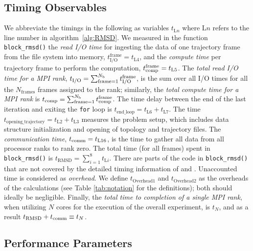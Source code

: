 \subsection{Timing Observables}

We abbreviate the timings in the following as variables $t_{\text{L$n$}}$ where $\text{L$n$}$ refers to the line number in algorithm~\ref{alg:RMSD}.
We measured in the function \texttt{block\_rmsd()} the \emph{read I/O time} for ingesting the data of one trajectory frame from the file system into memory, $t_{\text{I/O}}^{\text{frame}} = t_{\text{L4}}$, and the \emph{compute time} per trajectory frame to perform the computation, ${t}_{\text{comp}}^{\text{frame}} = t_{\text{L5}}$.
The \emph{total read I/O time for a MPI rank},  ${t}_{\text{I/O}} = \sum_{\text{frame}=1}^{N_{\text{b}}} {t}_{\text{I/O}}^{\text{frame}}$, is the sum over all I/O times for all the $N_{\text{frames}}$ frames assigned to the rank; similarly, the \emph{total compute time for a MPI rank} is ${t}_{\text{comp}} = \sum_{\text{frame}=1}^{N_{\text{b}}} {t}_{\text{comp}}^{\text{frame}}$. 
The time delay between the end of the last iteration and exiting the \texttt{for} loop is $t_{\text{end\_loop}} = t_{\text{L6}}+t_{\text{L7}}$.
The time $t_{\text{opening\_trajectory}} = t_{\text{L2}}+t_{\text{L3}}$ measures the problem setup, which includes data structure initialization and opening of topology and trajectory files.
The \emph{communication time}, $t_{\text{comm}} = t_{\text{L16}}$, is the time to gather all data from all processor ranks to rank zero.
The total time (for all frames) spent in \texttt{block\_rmsd()} is $t_{\text{RMSD}} = \sum_{i=1}^{8}t_{\text{L$i$}}$. 
There are parts of the code in \texttt{block\_rmsd()} that are not covered by the detailed timing information of \tcomp and \tIO.
Unaccounted time is considered as \emph{overhead}.
We define $t_{\text{Overhead1}}$ and $t_{\text{Overhead2}}$ as the overheads of the calculations (see Table \ref{tab:notation} for the definitions); both should ideally be negligible. 
Finally, the \emph{total time to completion of a single MPI rank}, when utilizing $N$ cores for the execution of the overall experiment, is $t_{N}$, and as a result $t_{\text{RMSD}} + t_{\text{comm}} \equiv t_{N}$.

\subsection{Performance Parameters}

